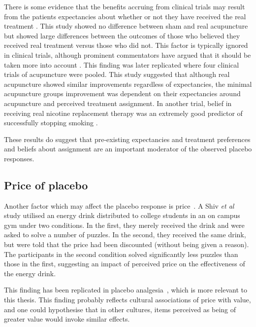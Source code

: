 There is some evidence that the benefits accruing from clinical trials may result from the patients expectancies about whether or not they have received the real treatment \cite{Bausell2005}. This study showed no difference between sham and real acupuncture but showed large differences between the outcomes of those who believed they received real treatment versus those who did not. This factor is typically ignored in clinical trials, although prominent commentators have argued that it should be taken more into account \cite{Benedetti2007}. This finding was later replicated \cite{Linde2007}  where four clinical trials of acupuncture were pooled. This study suggested that although real acupuncture showed similar improvements regardless of expectancies, the minimal acupuncture groups improvement was dependent on their expectancies around acupuncture and perceived treatment assignment. In another trial, belief in receiving real nicotine replacement therapy was an extremely good predictor of successfully stopping smoking \cite{Benedetti2008}. 

These results do suggest that pre-existing expectancies and treatment preferences and beliefs about assignment are an important moderator of the observed placebo responses. %

\subsection{Price of placebo}
\label{sec:price}

Another factor which may affect the placebo response is price~\cite{Shiv2005a}. A Shiv \textit{et al} study utilised an energy drink distributed to college students in an on campus gym under two conditions. In the first, they merely received the drink and were asked to solve a number of puzzles. In the second, they received the same drink, but were told that the price had been discounted (without being given a reason). The participants in the second condition solved significantly less puzzles than those in the first, suggesting an impact of perceived price on the effectiveness of the energy drink. 

This finding has been replicated in placebo analgesia~\cite{Waber2008}, which is more relevant to this thesis. %
This finding probably reflects cultural associations of price with value, and one could hypothesise that in other cultures, items perceived as being of greater value would invoke similar effects.  

